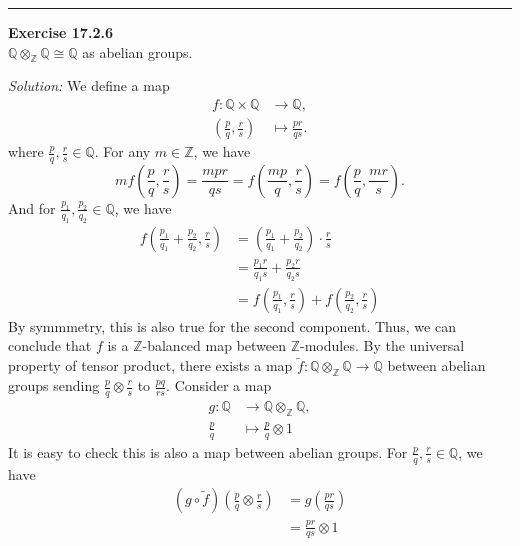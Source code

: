 \documentclass[a4paper, 12pt]{article}
\newenvironment{problem}[2][Exercise]
    { \begin{mdframed}[backgroundcolor=gray!20] \textbf{#1 #2} \\}
    {  \end{mdframed}}
\newenvironment{solution}
    {\textit{Solution:}}
    {}
\begin{document}
\noindent\rule{7in}{2.8pt}
\begin{problem}{17.2.6}
\(\mathbb{Q}\otimes_{\mathbb{Z}}\mathbb{Q}\cong \mathbb{Q}\) as abelian groups.
\end{problem}
\begin{solution}
We define a map 
\begin{align*}
	f:\mathbb{Q}\times \mathbb{Q}&\rightarrow \mathbb{Q},\\ 
	  (\frac{p}{q},\frac{r}{s})&\mapsto \frac{pr}{qs}.
\end{align*}
where \(\frac{p}{q},\frac{r}{s}\in \mathbb{Q}\). For any \(m\in \mathbb{Z}\), we have 
\[mf(\frac{p}{q},\frac{r}{s})=\frac{mpr}{qs}=f(\frac{mp}{q},\frac{r}{s})=f(\frac{p}{q},\frac{mr}{s}).\]
And for \(\frac{p_1}{q_1},\frac{p_2}{q_2}\in \mathbb{Q}\), we have 
\begin{align*}
f(\frac{p_1}{q_1}+\frac{p_2}{q_2},\frac{r}{s})&=(\frac{p_1}{q_1}+\frac{p_2}{q_2})\cdot \frac{r}{s}\\ 
                                              &=\frac{p_1r}{q_1s}+\frac{p_2r}{q_2s}\\ 
											  &=f(\frac{p_1}{q_1},\frac{r}{s})+f(\frac{p_2}{q_2},\frac{r}{s})
\end{align*}
By symmmetry, this is also true for the second component. Thus, we can conclude that \(f\) is a \(\mathbb{Z}\)-balanced map between \(\mathbb{Z}\)-modules. By the universal property of tensor product, there exists a map 
\(\tilde{f}:\mathbb{Q}\otimes_\mathbb{Z}\mathbb{Q}\rightarrow \mathbb{Q}\) between abelian groups sending \(\frac{p}{q}\otimes \frac{r}{s}\) to \(\frac{pq}{rs}\). Consider a map 
\begin{align*}
	g:\mathbb{Q}&\rightarrow \mathbb{Q}\otimes_\mathbb{Z}\mathbb{Q},\\ 
	  \frac{p}{q}&\mapsto \frac{p}{q}\otimes 1
\end{align*}
It is easy to check this is also a map between abelian groups. For \(\frac{p}{q}, \frac{r}{s}\in \mathbb{Q}\), we have 
\begin{align*}
	(g\circ \tilde{f})(\frac{p}{q}\otimes \frac{r}{s})&=g(\frac{pr}{qs})\\ 
	                                          &=\frac{pr}{qs}\otimes 1\\ 

\end{align*}
\end{solution}
\end{document}
